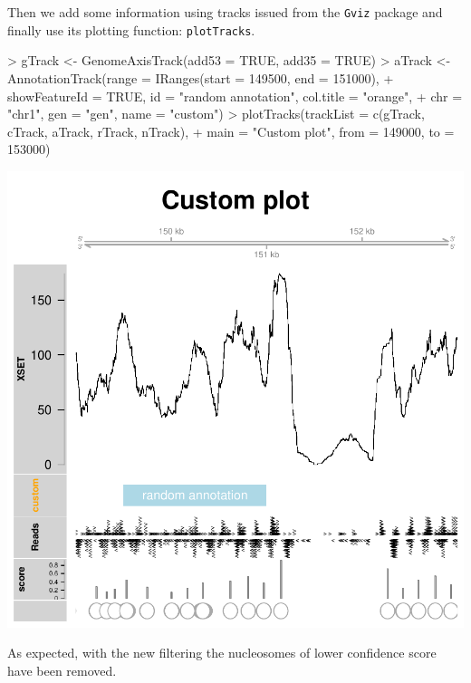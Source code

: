 \documentclass[11pt]{article}
\begin{document}
Then we add some information using tracks issued from the \texttt{Gviz} package and finally use its plotting function: \texttt{plotTracks}.
\begin{Schunk}
\begin{Sinput}
> gTrack <- GenomeAxisTrack(add53 = TRUE, add35 = TRUE)
> aTrack <- AnnotationTrack(range = IRanges(start = 149500, end = 151000), 
+     showFeatureId = TRUE, id = "random annotation", col.title = "orange", 
+     chr = "chr1", gen = "gen", name = "custom")
> plotTracks(trackList = c(gTrack, cTrack, aTrack, rTrack, nTrack), 
+     main = "Custom plot", from = 149000, to = 153000)
\end{Sinput}
\end{Schunk}
\includegraphics{PING-Gviz-tracks}

As expected, with the new filtering the nucleosomes of lower confidence score have been removed.
\end{document}
